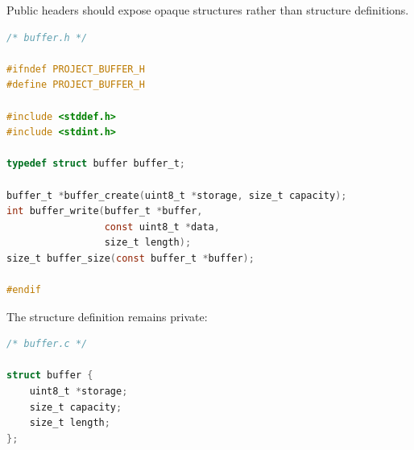 Public headers should expose opaque structures rather than structure definitions.

\begin{lstlisting}[language=C]
/* buffer.h */

#ifndef PROJECT_BUFFER_H
#define PROJECT_BUFFER_H

#include <stddef.h>
#include <stdint.h>

typedef struct buffer buffer_t;

buffer_t *buffer_create(uint8_t *storage, size_t capacity);
int buffer_write(buffer_t *buffer,
                 const uint8_t *data,
                 size_t length);
size_t buffer_size(const buffer_t *buffer);

#endif
\end{lstlisting}

The structure definition remains private:

\begin{lstlisting}[language=C]
/* buffer.c */

struct buffer {
	uint8_t *storage;
	size_t capacity;
	size_t length;
};
\end{lstlisting}
